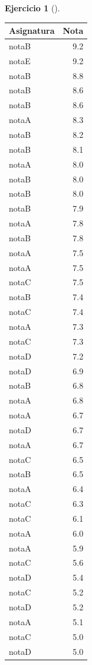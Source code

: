 \documentclass[
  a4paper,
]{scrreport}
\theoremstyle{definition}
\newtheorem{exercise}{Ejercicio}[chapter]
\theoremstyle{remark}
\begin{document}
\begin{exercise}[]
\begin{enumerate}
\begin{tcolorbox}
  \begin{longtable}[]{@{}lr@{}}
  \toprule\noalign{}
  Asignatura & Nota \\
  \midrule\noalign{}
  \endhead
  \bottomrule\noalign{}
  \endlastfoot
  notaB & 9.2 \\
  notaE & 9.2 \\
  notaB & 8.8 \\
  notaB & 8.6 \\
  notaB & 8.6 \\
  notaA & 8.3 \\
  notaB & 8.2 \\
  notaB & 8.1 \\
  notaA & 8.0 \\
  notaB & 8.0 \\
  notaB & 8.0 \\
  notaB & 7.9 \\
  notaA & 7.8 \\
  notaB & 7.8 \\
  notaA & 7.5 \\
  notaA & 7.5 \\
  notaC & 7.5 \\
  notaB & 7.4 \\
  notaC & 7.4 \\
  notaA & 7.3 \\
  notaC & 7.3 \\
  notaD & 7.2 \\
  notaD & 6.9 \\
  notaB & 6.8 \\
  notaA & 6.8 \\
  notaA & 6.7 \\
  notaD & 6.7 \\
  notaA & 6.7 \\
  notaC & 6.5 \\
  notaB & 6.5 \\
  notaA & 6.4 \\
  notaC & 6.3 \\
  notaC & 6.1 \\
  notaA & 6.0 \\
  notaA & 5.9 \\
  notaC & 5.6 \\
  notaD & 5.4 \\
  notaC & 5.2 \\
  notaD & 5.2 \\
  notaA & 5.1 \\
  notaC & 5.0 \\
  notaD & 5.0 \\

\end{longtable}
\end{tcolorbox}
\end{enumerate}
\end{exercise}
\end{document}
